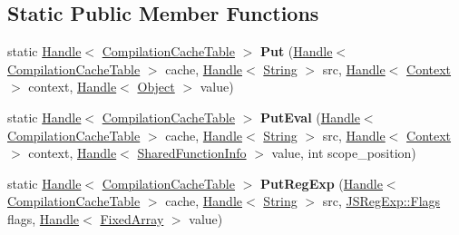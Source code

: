 \subsection*{Static Public Member Functions}
\begin{DoxyCompactItemize}
\item 
\hypertarget{classv8_1_1internal_1_1_compilation_cache_table_abf5860bf29d269be1cc3876fe891e8f7}{}static \hyperlink{classv8_1_1internal_1_1_handle}{Handle}$<$ \hyperlink{classv8_1_1internal_1_1_compilation_cache_table}{Compilation\+Cache\+Table} $>$ {\bfseries Put} (\hyperlink{classv8_1_1internal_1_1_handle}{Handle}$<$ \hyperlink{classv8_1_1internal_1_1_compilation_cache_table}{Compilation\+Cache\+Table} $>$ cache, \hyperlink{classv8_1_1internal_1_1_handle}{Handle}$<$ \hyperlink{classv8_1_1internal_1_1_string}{String} $>$ src, \hyperlink{classv8_1_1internal_1_1_handle}{Handle}$<$ \hyperlink{classv8_1_1internal_1_1_context}{Context} $>$ context, \hyperlink{classv8_1_1internal_1_1_handle}{Handle}$<$ \hyperlink{classv8_1_1internal_1_1_object}{Object} $>$ value)\label{classv8_1_1internal_1_1_compilation_cache_table_abf5860bf29d269be1cc3876fe891e8f7}

\item 
\hypertarget{classv8_1_1internal_1_1_compilation_cache_table_a4e1c1f54a3ad00eda721b8d5577b75d4}{}static \hyperlink{classv8_1_1internal_1_1_handle}{Handle}$<$ \hyperlink{classv8_1_1internal_1_1_compilation_cache_table}{Compilation\+Cache\+Table} $>$ {\bfseries Put\+Eval} (\hyperlink{classv8_1_1internal_1_1_handle}{Handle}$<$ \hyperlink{classv8_1_1internal_1_1_compilation_cache_table}{Compilation\+Cache\+Table} $>$ cache, \hyperlink{classv8_1_1internal_1_1_handle}{Handle}$<$ \hyperlink{classv8_1_1internal_1_1_string}{String} $>$ src, \hyperlink{classv8_1_1internal_1_1_handle}{Handle}$<$ \hyperlink{classv8_1_1internal_1_1_context}{Context} $>$ context, \hyperlink{classv8_1_1internal_1_1_handle}{Handle}$<$ \hyperlink{classv8_1_1internal_1_1_shared_function_info}{Shared\+Function\+Info} $>$ value, int scope\+\_\+position)\label{classv8_1_1internal_1_1_compilation_cache_table_a4e1c1f54a3ad00eda721b8d5577b75d4}

\item 
\hypertarget{classv8_1_1internal_1_1_compilation_cache_table_a0d5ff6bcfd3d4b9e5305b99fe8dfe33e}{}static \hyperlink{classv8_1_1internal_1_1_handle}{Handle}$<$ \hyperlink{classv8_1_1internal_1_1_compilation_cache_table}{Compilation\+Cache\+Table} $>$ {\bfseries Put\+Reg\+Exp} (\hyperlink{classv8_1_1internal_1_1_handle}{Handle}$<$ \hyperlink{classv8_1_1internal_1_1_compilation_cache_table}{Compilation\+Cache\+Table} $>$ cache, \hyperlink{classv8_1_1internal_1_1_handle}{Handle}$<$ \hyperlink{classv8_1_1internal_1_1_string}{String} $>$ src, \hyperlink{classv8_1_1internal_1_1_j_s_reg_exp_1_1_flags}{J\+S\+Reg\+Exp\+::\+Flags} flags, \hyperlink{classv8_1_1internal_1_1_handle}{Handle}$<$ \hyperlink{classv8_1_1internal_1_1_fixed_array}{Fixed\+Array} $>$ value)\label{classv8_1_1internal_1_1_compilation_cache_table_a0d5ff6bcfd3d4b9e5305b99fe8dfe33e}

\end{DoxyCompactItemize}
